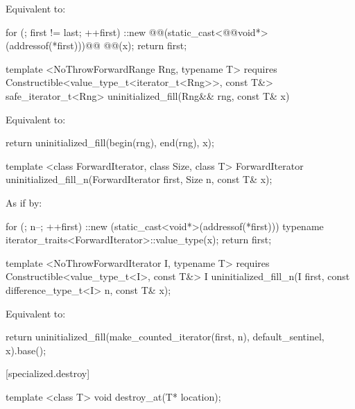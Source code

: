 \pnum
\effects Equivalent to:
\begin{codeblock}
    for (; first != last; ++first) {
      ::new @@(static_cast<@@void*>(addressof(*first)))@\added{)}@
        @@(x);
    }
    return first;
\end{codeblock}

{\color{addclr}
\begin{codeblock}
template <NoThrowForwardRange Rng, typename T>
requires
  Constructible<value_type_t<iterator_t<Rng>>, const T&>
safe_iterator_t<Rng> uninitialized_fill(Rng&& rng, const T& x)
\end{codeblock}

\pnum
\effects Equivalent to:
\begin{codeblock}
    return uninitialized_fill(begin(rng), end(rng), x);
\end{codeblock}
} %

{\color{remclr}
\begin{codeblock}
template <class ForwardIterator, class Size, class T>
  ForwardIterator uninitialized_fill_n(ForwardIterator first, Size n, const T& x);
\end{codeblock}

\setcounter{Paras}{1}
\pnum
\effects As if by:
\begin{codeblock}
        for (; n--; ++first)
          ::new (static_cast<void*>(addressof(*first)))
            typename iterator_traits<ForwardIterator>::value_type(x);
        return first;
\end{codeblock}
} %

{\color{addclr}
\begin{codeblock}
template <NoThrowForwardIterator I, typename T>
requires
  Constructible<value_type_t<I>, const T&>
I uninitialized_fill_n(I first, const difference_type_t<I> n, const T& x);
\end{codeblock}

\setcounter{Paras}{3}
\pnum
\effects Equivalent to:
\begin{codeblock}
    return uninitialized_fill(make_counted_iterator(first, n), default_sentinel{}, x).base();
\end{codeblock}
} %

[specialized.destroy]{}
{\color{remclr}
\begin{codeblock}
template <class T>
  void destroy_at(T* location);
\end{codeblock}
} %

